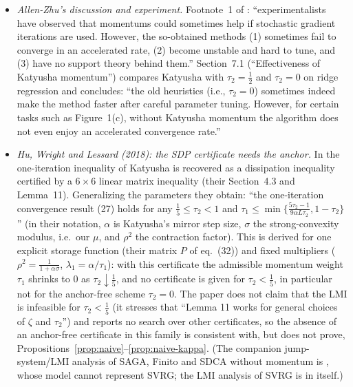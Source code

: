 \begin{itemize}
\item \emph{Allen-Zhu's discussion and experiment.} Footnote~1 of \cite{allenzhu2018katyusha}: ``experimentalists have observed that momentums could sometimes help if stochastic gradient iterations are used. However, the so-obtained methods (1) sometimes fail to converge in an accelerated rate, (2) become unstable and hard to tune, and (3) have no support theory behind them.'' Section~7.1 (``Effectiveness of Katyusha momentum'') compares Katyusha with $\tau_2=\frac12$ and $\tau_2=0$ on ridge regression and concludes: ``the old heuristics (i.e., $\tau_2=0$) sometimes indeed make the method faster after careful parameter tuning. However, for certain tasks such as Figure~1(c), without Katyusha momentum the algorithm does not even enjoy an accelerated convergence rate.''
\item \emph{Hu, Wright and Lessard (2018): the SDP certificate needs the anchor.} In \cite{hu2018dissipativity} the one-iteration inequality of Katyusha is recovered as a dissipation inequality certified by a $6\times6$ linear matrix inequality (their Section~4.3 and Lemma~11). Generalizing the parameters they obtain: ``the one-iteration convergence result (27) holds for any $\frac15\le\tau_2<1$ and $\tau_1\le\min\{\frac{5\tau_2-1}{9\alpha L\tau_2},1-\tau_2\}$'' (in their notation, $\alpha$ is Katyusha's mirror step size, $\sigma$ the strong-convexity modulus, i.e.\ our $\mu$, and $\rho^2$ the contraction factor). This is derived for one explicit storage function (their matrix $P$ of eq.~(32)) and fixed multipliers ($\rho^2=\frac1{1+\alpha\sigma}$, $\lambda_1=\alpha/\tau_1$): with this certificate the admissible momentum weight $\tau_1$ shrinks to $0$ as $\tau_2\downarrow\frac15$, and no certificate is given for $\tau_2<\frac15$, in particular not for the anchor-free scheme $\tau_2=0$. The paper does not claim that the LMI is infeasible for $\tau_2<\frac15$ (it stresses that ``Lemma 11 works for general choices of $\zeta$ and $\tau_2$'') and reports no search over other certificates, so the absence of an anchor-free certificate in this family is consistent with, but does not prove, Propositions~\ref{prop:naive}--\ref{prop:naive-kappa}. (The companion jump-system/LMI analysis of SAGA, Finito and SDCA without momentum is \cite{hu2017unified}, whose model cannot represent SVRG; the LMI analysis of SVRG is in \cite{hu2018dissipativity} itself.)

\end{itemize}

